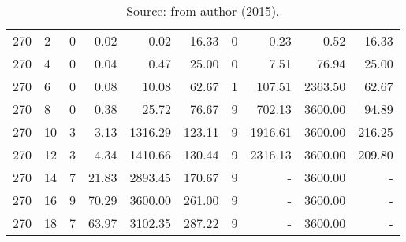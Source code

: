 \begin{appendices}
\begin{table*}[h]
\begin{center}
\begin{tabular} {l l | r r r r | r r r r}
270 & 2                             &  0                 &  0.02          &  0.02       &  16.33       &  0          &  0.23            &  0.52       &  16.33     \\ 
270 & 4                             &  0                 &  0.04          &  0.47       &  25.00       &  0          &  7.51            &  76.94      &  25.00     \\ 
270 & 6                             &  0                 &  0.08          &  10.08      &  62.67       &  1          &  107.51          &  2363.50    &  62.67     \\ 
270 & 8                             &  0                 &  0.38          &  25.72      &  76.67       &  9          &  702.13          &  3600.00    &  94.89     \\ 
270 & 10                            &  3                 &  3.13          &  1316.29    &  123.11      &  9          &  1916.61         &  3600.00    &  216.25    \\ 
270 & 12                            &  3                 &  4.34          &  1410.66    &  130.44      &  9          &  2316.13         &  3600.00    &  209.80    \\ 
270 & 14                            &  7                 &  21.83         &  2893.45    &  170.67      &  9          &  -               &  3600.00    &  -         \\ 
270 & 16                            &  9                 &  70.29         &  3600.00    &  261.00      &  9          &  -               &  3600.00    &  -         \\ 
270 & 18                            &  7                 &  63.97         &  3102.35    &  287.22      &  9          &  -               &  3600.00    &  -         \\ 
\hline
\end{tabular}\caption*{Source: from author (2015).}
\end{center}
\end{table*}



\end{appendices}
